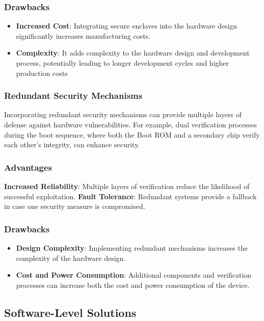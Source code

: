 \subsubsection{Drawbacks}

\begin{itemize}
    \item \textbf{Increased Cost}: Integrating secure enclaves into the hardware design significantly increases manufacturing costs.
    \item \textbf{Complexity}: It adds complexity to the hardware design and development process, potentially leading to longer development cycles and higher production costs
\end{itemize}
\subsubsection{Redundant Security Mechanisms}
Incorporating redundant security mechanisms can provide multiple layers of defense against hardware vulnerabilities. For example, dual verification processes during the boot sequence, where both the Boot ROM and a secondary chip verify each other's integrity, can enhance security.

\subsubsection{Advantages}

\textbf{Increased Reliability}: Multiple layers of verification reduce the likelihood of successful exploitation.
\textbf{Fault Tolerance}: Redundant systems provide a fallback in case one security measure is compromised.
\subsubsection{Drawbacks}

\begin{itemize}
    \item \textbf{Design Complexity}: Implementing redundant mechanisms increases the complexity of the hardware design.
    \item \textbf{Cost and Power Consumption}: Additional components and verification processes can increase both the cost and power consumption of the device.
\end{itemize}
\subsection{Software-Level Solutions}
